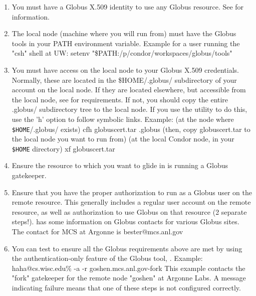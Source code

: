 \begin{enumerate}

\item You must have a Globus X.509 identity to use any Globus resource.
   See  for information.

\item The local node (machine where you will run  from)
   must have the Globus tools in your PATH environment variable.
   Example for a user running the "csh" shell at UW:
   setenv  "\$PATH:/p/condor/workspaces/globus/tools"

\item You must have access on the local node to your Globus X.509 credentials. 
   Normally, these are located in the \$HOME/.globus/ subdirectory of your 
   account on the local node. If they are located elsewhere, but accessible
   from the local node, see  
   for requirements. If not, you should copy the entire .globus/ subdirectory
   tree to the local node. If you use the  utility to do this, use the
   'h' option to follow symbolic links.
   Example:
    (at the node where \texttt{\$HOME}/.globus/ exists)  cfh globuscert.tar .globus
    (then, copy globuscert.tar to the local node you want to run
        from)
    (at the local Condor node, in your \texttt{\$HOME} directory)  xf globuscert.tar
   
\item Ensure the resource to which you want to glide in is running
   a Globus gatekeeper.

\item Ensure that you have the proper authorization to run as a Globus
   user on the remote resource. This generally includes a regular
   user account on the remote resource, as well as authorization to
   use Globus on that resource (2 separate steps!). 
    has some information on Globus contacts for
   various Globus sites. The contact for MCS at Argonne is 
   bester@mcs.anl.gov

\item You can test to ensure all the Globus requirements above are met by 
   using the authentication-only feature of the Globus tool, .
   Example: haha@cs.wisc.edu\%  -a -r goshen.mcs.anl.gov-fork
   This example contacts the "fork" gatekeeper for the remote node
   "goshen" at Argonne Labs. A message indicating failure means that
   one of these steps is not configured correctly.

\end{enumerate}

